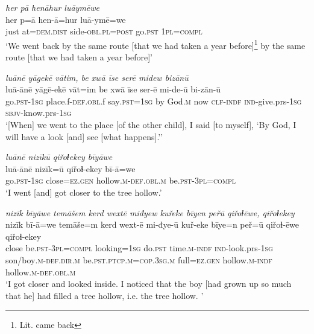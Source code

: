 \ea \label{ZQ.34}
\textit{her pā henāhur luāymēwe} \\ 
\gll her p=ā hen-ā=hur luā-ymē=we \\ 
 just at=\textsc{dem.dist} side\textsc{-obl}\textsc{.pl}\textsc{=\textsc{post}} go\textsc{.pst} \textsc{1pl}\textsc{=compl} \\ 
\glt `We went back by the same route [that we had taken a year before]\footnote{Lit. came back} by the same route [that we had taken a year before]'
\z 
 
\ea \label{ZQ.35}
\textit{luānē yāgekē vātim, be xwā īse serē midew bizānū} \\ 
\gll luā-ānē yāgē-ekē vāt=im be xwā īse ser-ē mi-de-ū bi-zān-ū \\ 
 go\textsc{.pst}\textsc{-\textsc{1sg}} place.f\textsc{-def}\textsc{.obl}.f say\textsc{.pst}\textsc{=\textsc{1sg}} by God\textsc{.m} now \textsc{clf}\textsc{-indf} \textsc{ind-}give.prs\textsc{-\textsc{1sg}} \textsc{sbjv-}know.prs\textsc{-\textsc{1sg}} \\ 
\glt `[When] we went to the place [of the other child], I said [to myself], ‘By God, I will have a look [and] see [what happens].’'
\z 
 
\ea \label{ZQ.36}
\textit{luānē nizīkū qiřoɫekey bīyāwe} \\ 
\gll luā-ānē nizīk=ū qiřoɫ-ekey bī-ā=we \\ 
 go\textsc{.pst}\textsc{-\textsc{1sg}} close=\textsc{ez.gen} hollow\textsc{.m}\textsc{-def}\textsc{.obl}\textsc{.m} be\textsc{.pst}\textsc{-3pl}\textsc{=compl} \\ 
\glt `I went [and] got closer to the tree hollow.'
\z 
 
\ea \label{ZQ.38}
\textit{nizīk bīyāwe temāšem kerd wextē miđyew kuřeke bīyen peřū qiřoɫēwe, qiřoɫekey} \\ 
\gll nizīk bī-ā=we temāše=m kerd wext-ē mi-đye-ū kuř-eke bīye=n peř=ū qiřoɫ-ēwe qiřoɫ-ekey \\ 
 close be\textsc{.pst}\textsc{-3pl}\textsc{=compl} looking\textsc{=\textsc{1sg}} do\textsc{.pst} time\textsc{.m}\textsc{-indf} \textsc{ind-}look.prs\textsc{-\textsc{1sg}} son/boy\textsc{.m}\textsc{-def}\textsc{.dir}\textsc{.m} be\textsc{.pst}\textsc{.ptcp}\textsc{.m}\textsc{=cop}\textsc{.3sg}\textsc{.m} full\textsc{=ez.gen} hollow\textsc{.m}\textsc{-indf} hollow\textsc{.m}\textsc{-def}\textsc{.obl}\textsc{.m} \\ 
\glt `I got closer and looked inside. I noticed that the boy [had grown up so much that he] had filled a tree hollow, i.e. the tree hollow. '
\z 
 
